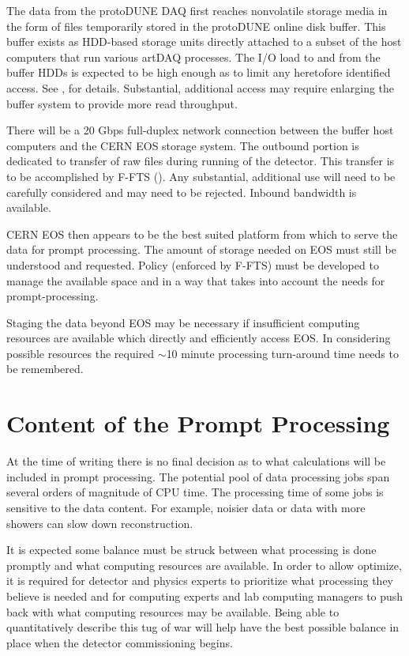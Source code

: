 \documentclass[pdftex,12pt,letter]{article}
\newcommand{\pd}{protoDUNE\xspace}
\begin{document}
The data from the \pd DAQ first reaches nonvolatile storage media in
the form of files temporarily stored in the \pd online disk
buffer. This buffer exists as HDD-based storage units directly
attached to a subset of the host computers that run various artDAQ
processes.  The I/O load to and from the buffer HDDs is expected to be
high enough as to limit any heretofore identified access.  See
\cite{docdb1086},\cite{docdb1212} for details.  Substantial,
additional access may require enlarging the buffer system to provide
more read throughput.

There will be a 20 Gbps full-duplex network connection between the
buffer host computers and the CERN EOS storage system.  The outbound
portion is dedicated to transfer of raw files during running of the
detector.  This transfer is to be accomplished by F-FTS
(\cite{docdb1212}).  Any substantial, additional use will need to be
carefully considered and may need to be rejected.  Inbound bandwidth
is available.

CERN EOS then appears to be the best suited platform from which to
serve the data for prompt processing.  The amount of storage needed on
EOS must still be understood and requested.  Policy (enforced by
F-FTS) must be developed to manage the available space and in a way
that takes into account the needs for prompt-processing.

Staging the data beyond EOS may be necessary if insufficient computing
resources are available which directly and efficiently access EOS.  In
considering possible resources the required $\sim$10 minute processing
turn-around time needs to be remembered.


\section{Content of the Prompt Processing}
At the time of writing there is no final decision as to what calculations will be included in prompt processing.
The potential pool of data processing jobs span several orders of magnitude of CPU time.
The processing time of some jobs is sensitive to the data content.  
For example, noisier data or data with more showers can slow down reconstruction.

It is expected some balance must be struck between what processing is
done promptly and what computing resources are available.  In order to
allow optimize, it is required for detector and physics experts to
prioritize what processing they believe is needed and for computing
experts and lab computing managers to push back with what computing
resources may be available.  Being able to quantitatively describe
this tug of war will help have the best possible balance in place when
the detector commissioning begins.
\end{document}
